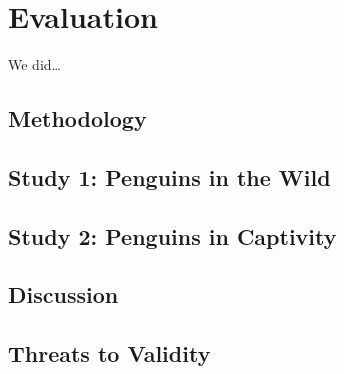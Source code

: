 \setchaptertoc
\chapter{Evaluation}\label{chp:evaluation}

\begin{summary}
We did\ldots
\end{summary}

\section{Methodology}

\section[Study 1]{Study 1: Penguins in the Wild}

\section[Study 2]{Study 2: Penguins in Captivity}

\section{Discussion}

\section[Threats]{Threats to Validity}